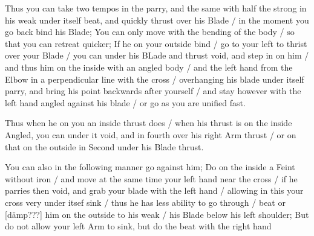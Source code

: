 
Thus you can take two tempos in the parry, and the same with half the
strong in his weak under itself beat, and quickly thrust over his
Blade / in the moment you go back bind his Blade; You can only move with
the bending of the body / so that you can retreat quicker; If he on
your outside bind / go to your left to thrist over your Blade / you
can under his BLade and thrust void, and step in on him / and thus him
on the inside with an angled body / and the left hand from the Elbow
in a perpendicular line with the cross / overhanging his blade under
itself parry, and bring his point backwards after yourself / and stay
however with the left hand angled against his blade / or go as you are
unified fast.


Thus when he on you an inside thrust does / when his thrust is on the
inside Angled, you can under it void, and in fourth over his right Arm
thrust / or on that on the outside in Second under his Blade thrust.


You can also in the following manner go against him; Do on the inside
a Feint without iron / and move at the same time your left hand near
the cross / if he parries then void, and grab your blade with the left
hand / allowing in this your cross very under itsef sink / thus he has
less ability to go through / beat or [dämp???] him on the outside to his weak / his Blade
below his left shoulder; But do not allow your left Arm to sink, but
do the beat with the right hand